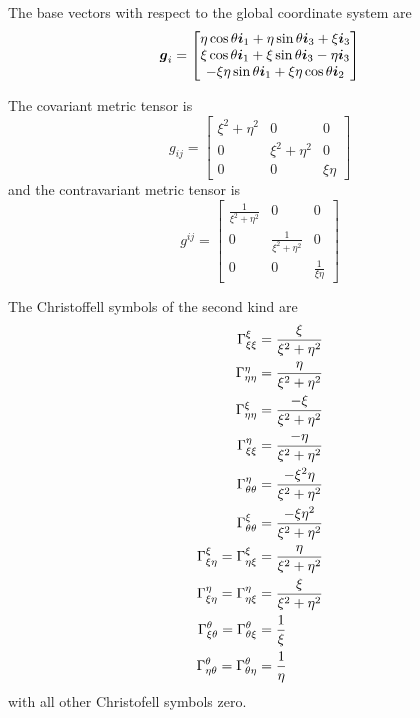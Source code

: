 The base vectors with respect to the global coordinate system are
\begin{equation}
  \boldsymbol{g}_{i}=\begin{bmatrix} 
    \eta\cos\theta\boldsymbol{i}_{1}+\eta\sin\theta\boldsymbol{i}_{3}+\xi\boldsymbol{i}_{3}\\
    \xi\cos\theta\boldsymbol{i}_{1}+\xi\sin\theta\boldsymbol{i}_{3}-\eta\boldsymbol{i}_{3}\\ 
    -\xi\eta\sin\theta\boldsymbol{i}_{1}+\xi\eta\cos\theta\boldsymbol{i}_{2}
  \end{bmatrix}
\end{equation}

The covariant metric tensor is
\begin{equation}
  g_{ij}=\begin{bmatrix}
    \xi^{2}+\eta^{2} & 0 & 0 \\
    0 & \xi^{2}+\eta^{2} & 0 \\
    0 & 0 & \xi\eta
  \end{bmatrix}
\end{equation}
and the contravariant metric tensor is
\begin{equation}
  g^{ij}=\begin{bmatrix}
    \frac{1}{\xi^{2}+\eta^{2}}& 0 & 0 \\
    0 & \frac{1}{\xi^{2}+\eta^{2}} & 0 \\
    0 & 0 & \frac{1}{\xi\eta}
  \end{bmatrix}
\end{equation}

The Christoffell symbols of the second kind are
\begin{align}
   \Gamma^{\xi}_{\xi\xi} &=\frac{\xi}{\xi^{2}+\eta^{2}} \\
   \Gamma^{\eta}_{\eta\eta} &=\frac{\eta}{\xi^{2}+\eta^{2}} \\
   \Gamma^{\xi}_{\eta\eta} &=\frac{-\xi}{\xi^{2}+\eta^{2}} \\
   \Gamma^{\eta}_{\xi\xi} &=\frac{-\eta}{\xi^{2}+\eta^{2}} \\
   \Gamma^{\eta}_{\theta\theta} &=\frac{-\xi^{2}\eta}{\xi^{2}+\eta^{2}} \\
   \Gamma^{\xi}_{\theta\theta} &=\frac{-\xi\eta^{2}}{\xi^{2}+\eta^{2}} \\
   \Gamma^{\xi}_{\xi\eta} = \Gamma^{\xi}_{\eta\xi} &=\frac{\eta}{\xi^{2}+\eta^{2}} \\
   \Gamma^{\eta}_{\xi\eta} = \Gamma^{\eta}_{\eta\xi} &=\frac{\xi}{\xi^{2}+\eta^{2}} \\
   \Gamma^{\theta}_{\xi\theta} = \Gamma^{\theta}_{\theta\xi} &=\frac{1}{\xi} \\
   \Gamma^{\theta}_{\eta\theta} = \Gamma^{\theta}_{\theta\eta} &=\frac{1}{\eta} \\
\end{align}
with all other Christofell symbols zero.

